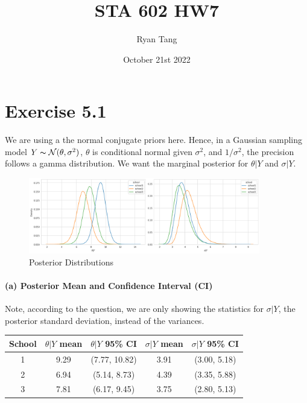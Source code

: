 \documentclass[11pt, letterpaper]{article}
\author{Ryan Tang}
\title{STA 602 HW7}
\date{October 21st 2022}
\begin{document}
\maketitle

\section{Exercise 5.1}
We are using a the normal conjugate priors here. Hence, in a Gaussian sampling model $Y \thicksim \mathcal{N}(\theta, \sigma^2)$, $\theta$ is conditional normal given $\sigma^2$, and $1/\sigma^2$, the precision follows a gamma distribution. We want the marginal posterior for $\theta|Y$ and $\sigma|Y$.
\begin{figure}[!h]
  \centering
  \includegraphics[width=0.9\textwidth]{5.1.a.png}
  \captionsetup{justification=centering}
  \caption{Posterior Distributions}
\end{figure}

\paragraph{(a) Posterior Mean and Confidence Interval (CI)}
Note, according to the question, we are only showing the statistics for $\sigma|Y$, the posterior standard deviation, instead of the variances.
\begin{center}
\begin{tabular}{||c c c c c||} 
 \hline
 School & $\theta|Y$ mean & $\theta|Y$ 95\% CI & $\sigma|Y$ mean & $\sigma|Y$ 95\% CI \\ [0.5ex] 
 \hline\hline
 1 & 9.29 & (7.77, 10.82) & 3.91 & (3.00, 5.18) \\ 
 \hline
 2 & 6.94 & (5.14, 8.73) & 4.39 & (3.35, 5.88) \\
 \hline
 3 & 7.81 & (6.17, 9.45) & 3.75 & (2.80, 5.13) \\
 \hline
\end{tabular}
\end{center}
\end{document}
